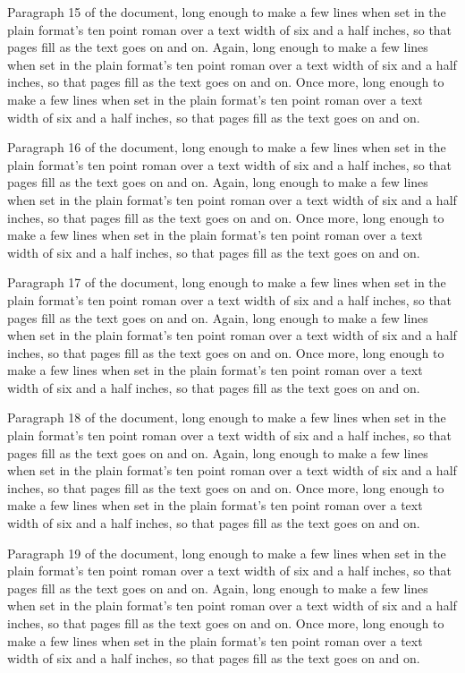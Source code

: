Paragraph 15 of the document, long enough to make a few lines when set in the plain format's ten point roman over a text width of six and a half inches, so that pages fill as the text goes on and on. Again, long enough to make a few lines when set in the plain format's ten point roman over a text width of six and a half inches, so that pages fill as the text goes on and on. Once more, long enough to make a few lines when set in the plain format's ten point roman over a text width of six and a half inches, so that pages fill as the text goes on and on.

Paragraph 16 of the document, long enough to make a few lines when set in the plain format's ten point roman over a text width of six and a half inches, so that pages fill as the text goes on and on. Again, long enough to make a few lines when set in the plain format's ten point roman over a text width of six and a half inches, so that pages fill as the text goes on and on. Once more, long enough to make a few lines when set in the plain format's ten point roman over a text width of six and a half inches, so that pages fill as the text goes on and on.

Paragraph 17 of the document, long enough to make a few lines when set in the plain format's ten point roman over a text width of six and a half inches, so that pages fill as the text goes on and on. Again, long enough to make a few lines when set in the plain format's ten point roman over a text width of six and a half inches, so that pages fill as the text goes on and on. Once more, long enough to make a few lines when set in the plain format's ten point roman over a text width of six and a half inches, so that pages fill as the text goes on and on.

Paragraph 18 of the document, long enough to make a few lines when set in the plain format's ten point roman over a text width of six and a half inches, so that pages fill as the text goes on and on. Again, long enough to make a few lines when set in the plain format's ten point roman over a text width of six and a half inches, so that pages fill as the text goes on and on. Once more, long enough to make a few lines when set in the plain format's ten point roman over a text width of six and a half inches, so that pages fill as the text goes on and on.

Paragraph 19 of the document, long enough to make a few lines when set in the plain format's ten point roman over a text width of six and a half inches, so that pages fill as the text goes on and on. Again, long enough to make a few lines when set in the plain format's ten point roman over a text width of six and a half inches, so that pages fill as the text goes on and on. Once more, long enough to make a few lines when set in the plain format's ten point roman over a text width of six and a half inches, so that pages fill as the text goes on and on.

